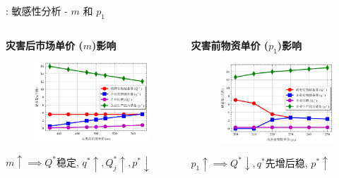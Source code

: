 \documentclass[9pt]{beamer}
\begin{document}
\begin{frame}{\insertsectionhead: 敏感性分析 - $m$ 和 $p_1$}
    \begin{columns}[T]
        \begin{column}{0.5\textwidth}
            \textbf{灾害后市场单价 ($m$)影响}
            \begin{figure}
                \includegraphics[width=\linewidth]{basic_pictures/sensitivity_m.png}
                \caption*{}
            \end{figure}
            \footnotesize $m \uparrow \implies Q^*$稳定, $q^* \uparrow, Q_j^* \uparrow, p^* \downarrow$
        \end{column}
        \begin{column}{0.5\textwidth}
            \textbf{灾害前物资单价 ($p_1$)影响}
            \begin{figure}
                \includegraphics[width=\linewidth]{basic_pictures/sensitivity_p1.png}
                \caption*{}
            \end{figure}
            \footnotesize $p_1 \uparrow \implies Q^* \downarrow, q^*$先增后稳, $p^* \uparrow$
        \end{column}
    \end{columns}
\end{frame}
\end{document}
